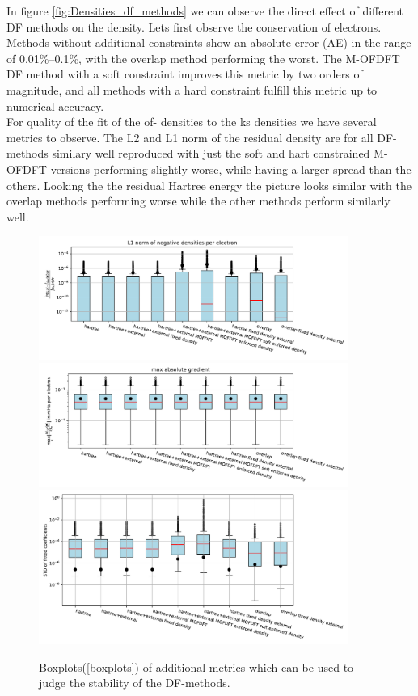In figure \ref{fig:Densities_df_methods} we can observe the direct effect of different DF methods on the density. Lets first observe the conservation of electrons. Methods without additional constraints show an absolute error (AE) in the range of 0.01\%–0.1\%, with the overlap method performing the worst. The M-OFDFT DF method with a soft constraint improves this metric by two orders of magnitude, and all methods with a hard constraint fulfill this metric up to numerical accuracy.\\
For quality of the fit of the of- densities to the ks densities we have several metrics to observe. The L2 and L1 norm of the residual density are for all DF-methods similary well reproduced with just the soft and hart constrained M-OFDFT-versions performing slightly worse, while having a larger spread than the others. Looking the the residual Hartree energy the picture looks similar with the overlap methods performing worse while the other methods perform similarly well.\\
\begin{figure}
    \includegraphics[width=0.9\textwidth]{chapters/results/results_images/L1_negative_densities_on_even_tempered_2.5_for_different_df_methods}
    \includegraphics[width=0.9\textwidth]{chapters/results/results_images/max_abs_gradient_on_even_tempered_2.5_for_different_df_methods}
    \includegraphics[width=0.9\textwidth]{chapters/results/results_images/var_density_fitting}
    \caption{Boxplots(\ref{boxplots}) of additional metrics which can be used to judge the stability of the DF-methods.}
    \label{fig:other_df_metrics}
\end{figure}

